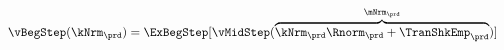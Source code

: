   \begin{equation}\begin{gathered}\begin{aligned}
        \vBegStep(\kNrm_{\prd}) & = \ExBegStep[\vMidStep(\overbrace{\kNrm_{\prd} \Rnorm_{\prd} + \TranShkEmp_{\prd}}^{\mNrm_{\prd}})]  \label{eq:vBegStep}
      \end{aligned}\end{gathered}\end{equation}
